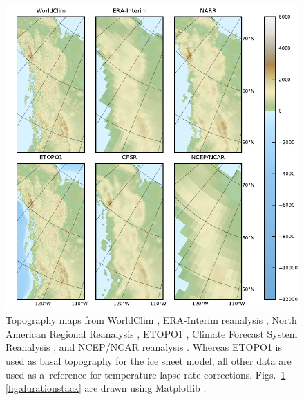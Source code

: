\documentclass[tc, ms]{copernicus}
\begin{document}
\begin{figure}
  \includegraphics{cordillera-climate-topo}
  \caption{Topography maps from WorldClim \citep{data:worldclim}, ERA-Interim reanalysis \citep{data:erai}, North American Regional Reanalysis \citep[NARR;][]{data:narr}, ETOPO1 \citep{data:etopo1}, Climate Forecast System Reanalysis \citep[CFSR;][]{data:cfsr}, and NCEP/NCAR reanalysis \citep{data:ncar}. Whereas ETOPO1 is used as basal topography for the ice sheet model, all other data are used as a~reference for temperature lapse-rate corrections. Figs.~\ref{fig:topo}--\ref{fig:durationstack} are drawn using Matplotlib \citep{soft:mpl}.}
  \label{fig:topo}
\end{figure}
\end{document}
